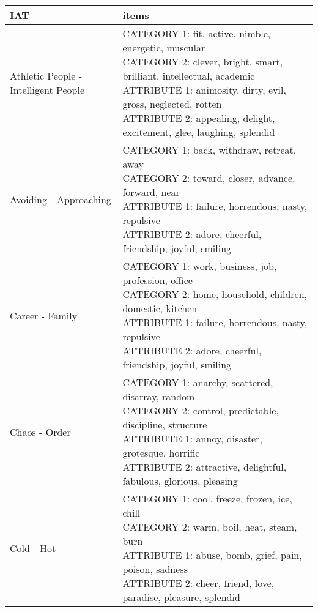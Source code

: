 \documentclass[]{article}
\begin{document}
\begin{table}[H]
\centering\begingroup\fontsize{7}{9}\selectfont

\begin{tabular}{l|l}
\hline
IAT & items\\
\hline
Athletic People - Intelligent People & \makecell[l]{CATEGORY 1:  fit, active, nimble, energetic, muscular \\ CATEGORY 2:  clever, bright, smart, brilliant, intellectual, academic \\ ATTRIBUTE 1:  animosity, dirty, evil, gross, neglected, rotten \\ ATTRIBUTE 2:  appealing, delight, excitement, glee, laughing, splendid \\}\\
\hline
Avoiding - Approaching & \makecell[l]{CATEGORY 1:  back, withdraw, retreat, away \\ CATEGORY 2:  toward, closer, advance, forward, near \\ ATTRIBUTE 1:  failure, horrendous, nasty, repulsive \\ ATTRIBUTE 2:  adore, cheerful, friendship, joyful, smiling \\}\\
\hline
Career - Family & \makecell[l]{CATEGORY 1:  work, business, job, profession, office \\ CATEGORY 2:  home, household, children, domestic, kitchen \\ ATTRIBUTE 1:  failure, horrendous, nasty, repulsive \\ ATTRIBUTE 2:  adore, cheerful, friendship, joyful, smiling \\}\\
\hline
Chaos - Order & \makecell[l]{CATEGORY 1:  anarchy, scattered, disarray, random \\ CATEGORY 2:  control, predictable, discipline, structure \\ ATTRIBUTE 1:  annoy, disaster, grotesque, horrific \\ ATTRIBUTE 2:  attractive, delightful, fabulous, glorious, pleasing \\}\\
\hline
Cold - Hot & \makecell[l]{CATEGORY 1:  cool, freeze, frozen, ice, chill \\ CATEGORY 2:  warm, boil, heat, steam, burn \\ ATTRIBUTE 1:  abuse, bomb, grief, pain, poison, sadness \\ ATTRIBUTE 2:  cheer, friend, love, paradise, pleasure, splendid \\}\\

\end{tabular}
\end{table}
\end{document}
